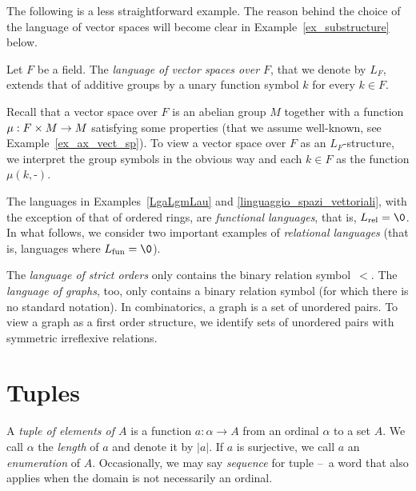 The following is a less straightforward example. The reason behind the choice of the language of vector spaces will become clear in Example~\ref{ex_substructure} below.

\begin{example}\label{linguaggio_spazi_vettoriali}
Let $F$ be a field. The \emph{language of vector spaces over $F$\/}, that we denote by $L_F$, extends that of additive groups by a unary function symbol $k$ for every $k\in F$. 

Recall that a vector space over $F$ is an abelian group $M$ together with a function $\mu:F\times M\rightarrow M$ satisfying some properties (that we assume well-known, see Example~\ref{ex_ax_vect_sp}).
 To view a vector space over $F$ as an $L_F$-structure, we interpret the group symbols in the obvious way and each $k\in F$ as the function $\mu(k,\mbox{-})$.\QED
\end{example}

The languages in Examples~\ref{LgaLgmLau} and \ref{linguaggio_spazi_vettoriali}, with the exception of that of ordered rings, are \emph{functional languages}, that is, $L_{\rm rel}=\0$. In what follows, we consider two important examples of \emph{relational languages\/} (that is, languages where $L_{\rm fun}=\0$).

\begin{example}\label{expl_graph1}
The \emph{language of strict orders\/} only contains the binary relation symbol~$<$. The \emph{language of graphs\/}, too, only contains a binary relation symbol (for which there is no standard notation). %
 In combinatorics, a graph is a set of unordered pairs. To view a graph as a first order structure, we identify sets of unordered pairs with symmetric irreflexive relations.\QED %
\end{example}


\section{Tuples}
A \emph{tuple of elements of $A$\/} is a function $a:\alpha\to A$ from an ordinal $\alpha$ to a set $A$.  We call $\alpha$ the \emph{length} of $a$ and denote it by \emph{$|a|$}. If $a$ is surjective, we call $a$ an \emph{enumeration\/} of $A$. Occasionally, we may say \emph{sequence\/} for tuple --~a word that also applies when the domain is not necessarily an ordinal.

